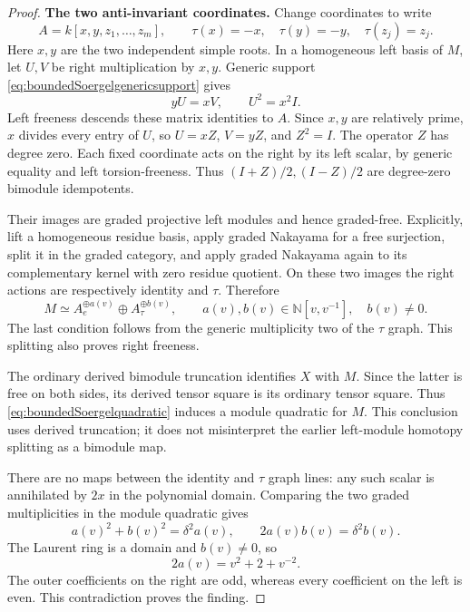\documentclass[11pt,a4paper]{article}
\theoremstyle{named}\newtheorem{finding}{Finding}[section]
\theoremstyle{definition}\newtheorem{definition}[finding]{Definition}
\theoremstyle{remark}\newtheorem{remark}[finding]{Remark}
\begin{document}
\begin{proof}
\par\smallskip\noindent\textbf{The two anti-invariant coordinates.}\quad
Change coordinates to write
\[
 A=k[x,y,z_1,\ldots,z_m],\qquad
 \tau(x)=-x,\quad\tau(y)=-y,\quad\tau(z_j)=z_j.
\]
Here \(x,y\) are the two independent simple roots. In a
homogeneous left basis of \(M\), let \(U,V\) be right
multiplication by \(x,y\). Generic support
\eqref{eq:boundedSoergelgenericsupport} gives
\[
                       yU=xV,\qquad U^2=x^2I.
\]
Left freeness descends these matrix identities to \(A\).
Since \(x,y\) are relatively prime, \(x\) divides every
entry of \(U\), so \(U=xZ\), \(V=yZ\), and \(Z^2=I\).
The operator \(Z\) has degree zero. Each fixed coordinate
acts on the right by its left scalar, by generic equality
and left torsion-freeness. Thus
\((I+Z)/2,(I-Z)/2\) are degree-zero bimodule idempotents.

Their images are graded projective left modules and hence
graded-free. Explicitly, lift a homogeneous residue basis,
apply graded Nakayama for a free surjection, split it in the
graded category, and apply graded Nakayama again to its
complementary kernel with zero residue quotient. On these
two images the right actions are respectively identity and
\(\tau\). Therefore
\begin{equation}\label{eq:boundedSoergelgraphsplit}
 M\simeq A_e^{\oplus a(v)}\oplus A_\tau^{\oplus b(v)},
 \qquad a(v),b(v)\in\mathbb N[v,v^{-1}],\quad b(v)\ne0.
\end{equation}
The last condition follows from the generic multiplicity
two of the \(\tau\) graph. This splitting also proves
right freeness.

The ordinary derived bimodule truncation identifies \(X\)
with \(M\). Since the latter is free on both sides, its
derived tensor square is its ordinary tensor square.
Thus \eqref{eq:boundedSoergelquadratic} induces a module
quadratic for \(M\). This conclusion uses derived
truncation; it does not misinterpret the earlier
left-module homotopy splitting as a bimodule map.

There are no maps between the identity and \(\tau\)
graph lines: any such scalar is annihilated by \(2x\)
in the polynomial domain. Comparing the two graded
multiplicities in the module quadratic gives
\[
 a(v)^2+b(v)^2=\delta^2a(v),\qquad
 2a(v)b(v)=\delta^2b(v).
\]
The Laurent ring is a domain and \(b(v)\ne0\), so
\[
                       2a(v)=v^2+2+v^{-2}.
\]
The outer coefficients on the right are odd, whereas
every coefficient on the left is even. This contradiction
proves the finding.
\end{proof}
\end{document}
